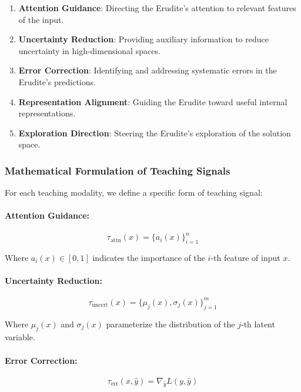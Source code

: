 \begin{enumerate}
\item \textbf{Attention Guidance}: Directing the Erudite's attention to relevant features of the input.

\item \textbf{Uncertainty Reduction}: Providing auxiliary information to reduce uncertainty in high-dimensional spaces.

\item \textbf{Error Correction}: Identifying and addressing systematic errors in the Erudite's predictions.

\item \textbf{Representation Alignment}: Guiding the Erudite toward useful internal representations.

\item \textbf{Exploration Direction}: Steering the Erudite's exploration of the solution space.
\end{enumerate}

\subsubsection{Mathematical Formulation of Teaching Signals}

For each teaching modality, we define a specific form of teaching signal:

\paragraph{Attention Guidance:}
\begin{equation}
\tau_{\text{attn}}(x) = \{a_i(x)\}_{i=1}^n
\end{equation}

Where $a_i(x) \in [0,1]$ indicates the importance of the $i$-th feature of input $x$.

\paragraph{Uncertainty Reduction:}
\begin{equation}
\tau_{\text{uncert}}(x) = \{\mu_j(x), \sigma_j(x)\}_{j=1}^m
\end{equation}

Where $\mu_j(x)$ and $\sigma_j(x)$ parameterize the distribution of the $j$-th latent variable.

\paragraph{Error Correction:}
\begin{equation}
\tau_{\text{err}}(x, \hat{y}) = \nabla_{\hat{y}} L(y, \hat{y})
\end{equation}

